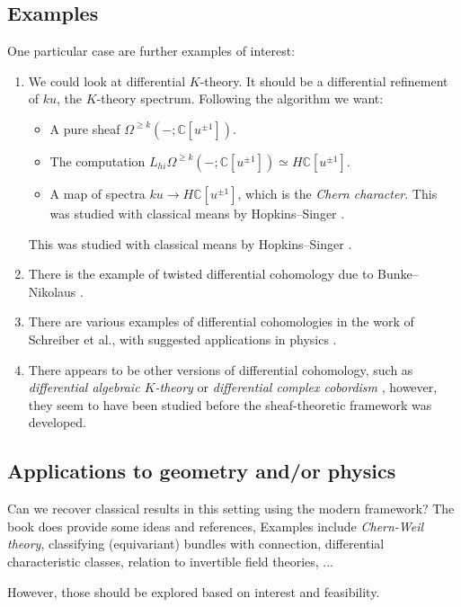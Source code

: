 \documentclass[10pt]{amsart}
\newcommand{\bC}{\mathbb{C}}
\theoremstyle{definition}
\theoremstyle{remark}
\numberwithin{equation}{section}
\begin{document}
\subsection{Examples}
One particular case are further examples of interest:
\begin{enumerate}
  \item We could look at differential $K$-theory. It should be a differential refinement of $ku$, the $K$-theory spectrum. Following the algorithm we want:
  \begin{itemize}
   \item A pure sheaf $\Omega^{\geq k}(- ;\mathbb{C}[u^{\pm 1}])$.
   \item The computation $L_{hi}\Omega^{\geq k}(- ;\mathbb{C}[u^{\pm 1}]) \simeq H\bC[u^{\pm 1}]$.
   \item A map of spectra $ku \to H\bC[u^{\pm 1}]$, which is the \emph{Chern character}. This was studied with classical means by Hopkins--Singer \cite{hopkinssinger2005diffcoh}.
  \end{itemize}
  This was studied with classical means by Hopkins--Singer \cite{hopkinssinger2005diffcoh}.
  \item There is the example of twisted differential cohomology due to Bunke--Nikolaus \cite{bunkenikolaus2019twisted}.
  \item There are various examples of differential cohomologies in the work of Schreiber et al., with suggested applications in physics \cite{fiorenzasatischreiber2024charactermap}. 
  \item There appears to be other versions of differential cohomology, such as \emph{differential algebraic $K$-theory} \cite{bunkegepner2021diffktheory} or \emph{differential complex cobordism} \cite{bunkeschickschroederwiethaup2009landweber}, however, they seem to have been studied before the sheaf-theoretic framework was developed.
\end{enumerate}

\subsection{Applications to geometry and/or physics}
Can we recover classical results in this setting using the modern framework? The book \cite{amabeldebrayhaine2021diffcoh} does provide some ideas and references, Examples include \emph{Chern-Weil theory}, classifying (equivariant) bundles with connection, differential characteristic classes, relation to invertible field theories, ... 

However, those should be explored based on interest and feasibility.

{\footnotesize


}
\end{document}
